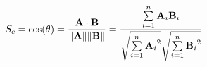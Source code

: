 \documentclass[10pt]{article}
\begin{document}
\begin{align*}S_c = \cos (\theta)= {{\bf A} \cdot {\bf B} \over \|{\bf A}\|  \|{\bf B}\|} = \frac{ \sum\limits_{i=1}^{n}{{\bf A}_i{\bf B}_i} }{ \sqrt{\sum\limits_{i=1}^{n}{{{\bf A}_i}^2}} \sqrt{\sum\limits_{i=1}^{n}{{{\bf B}_i}^2}} }
\end{align*}
\end{document}
